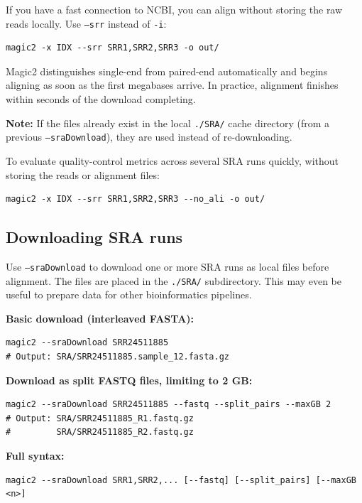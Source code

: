 \documentclass[11pt]{article}
\newcommand{\code}[1]{\texttt{#1}}
\begin{document}
If you have a fast connection to NCBI, you can align without storing the
raw reads locally.  Use \code{--srr} instead of \code{-i}:
\begin{lstlisting}
magic2 -x IDX --srr SRR1,SRR2,SRR3 -o out/
\end{lstlisting}

Magic2 distinguishes single-end from paired-end automatically and begins
aligning as soon as the first megabases arrive.  In practice, alignment
finishes within seconds of the download completing.

\begin{notebox}
\textbf{Note:} If the files already exist in the local \code{./SRA/}
cache directory (from a previous \code{--sraDownload}), they are used
instead of re-downloading.
\end{notebox}

To evaluate quality-control metrics across several SRA runs quickly,
without storing the reads or alignment files:
\begin{lstlisting}
magic2 -x IDX --srr SRR1,SRR2,SRR3 --no_ali -o out/
\end{lstlisting}

\subsection{Downloading SRA runs}

Use \code{--sraDownload} to download one or more SRA runs as local files
before alignment.  The files are placed in the \code{./SRA/} subdirectory.
This may even be useful to prepare data for other bioinformatics pipelines.

\textbf{Basic download (interleaved FASTA):}
\begin{lstlisting}
magic2 --sraDownload SRR24511885
# Output: SRA/SRR24511885.sample_12.fasta.gz
\end{lstlisting}

\textbf{Download as split FASTQ files, limiting to 2 GB:}
\begin{lstlisting}
magic2 --sraDownload SRR24511885 --fastq --split_pairs --maxGB 2
# Output: SRA/SRR24511885_R1.fastq.gz
#         SRA/SRR24511885_R2.fastq.gz
\end{lstlisting}

\textbf{Full syntax:}
\begin{lstlisting}
magic2 --sraDownload SRR1,SRR2,... [--fastq] [--split_pairs] [--maxGB <n>]
\end{lstlisting}
\end{document}
